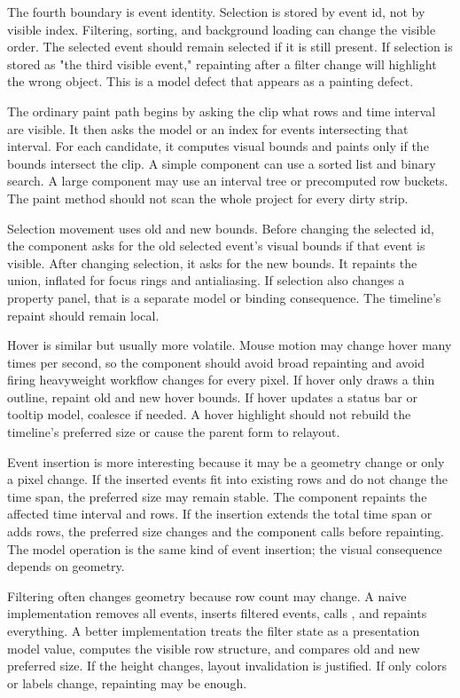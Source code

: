 The fourth boundary is event identity. Selection is stored by event id, not by visible index. Filtering, sorting, and background loading can change the visible order. The selected event should remain selected if it is still present. If selection is stored as "the third visible event," repainting after a filter change will highlight the wrong object. This is a model defect that appears as a painting defect.

The ordinary paint path begins by asking the clip what rows and time interval are visible. It then asks the model or an index for events intersecting that interval. For each candidate, it computes visual bounds and paints only if the bounds intersect the clip. A simple component can use a sorted list and binary search. A large component may use an interval tree or precomputed row buckets. The paint method should not scan the whole project for every dirty strip.

Selection movement uses old and new bounds. Before changing the selected id, the component asks for the old selected event's visual bounds if that event is visible. After changing selection, it asks for the new bounds. It repaints the union, inflated for focus rings and antialiasing. If selection also changes a property panel, that is a separate model or binding consequence. The timeline's repaint should remain local.

Hover is similar but usually more volatile. Mouse motion may change hover many times per second, so the component should avoid broad repainting and avoid firing heavyweight workflow changes for every pixel. If hover only draws a thin outline, repaint old and new hover bounds. If hover updates a status bar or tooltip model, coalesce if needed. A hover highlight should not rebuild the timeline's preferred size or cause the parent form to relayout.

Event insertion is more interesting because it may be a geometry change or only a pixel change. If the inserted events fit into existing rows and do not change the time span, the preferred size may remain stable. The component repaints the affected time interval and rows. If the insertion extends the total time span or adds rows, the preferred size changes and the component calls  before repainting. The model operation is the same kind of event insertion; the visual consequence depends on geometry.

Filtering often changes geometry because row count may change. A naive implementation removes all events, inserts filtered events, calls , and repaints everything. A better implementation treats the filter state as a presentation model value, computes the visible row structure, and compares old and new preferred size. If the height changes, layout invalidation is justified. If only colors or labels change, repainting may be enough.

